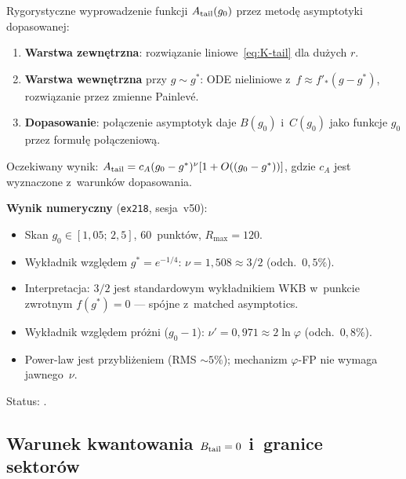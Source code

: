 \begin{problem}\label{prob:K-OJ1}
Rygorystyczne wyprowadzenie funkcji $A_{\rm tail}(g_0)$
przez metodę asymptotyki dopasowanej:
\begin{enumerate}[nosep]
  \item \textbf{Warstwa zewnętrzna}: rozwiązanie liniowe~\eqref{eq:K-tail}
        dla dużych $r$.
  \item \textbf{Warstwa wewnętrzna} przy $g \sim g^*$: ODE nieliniowe
        z~$f \approx f'_*(g-g^*)$, rozwiązanie przez zmienne Painlevé.
  \item \textbf{Dopasowanie}: połączenie asymptotyk daje $B(g_0)$ i~$C(g_0)$
        jako funkcje $g_0$ przez formułę połączeniową.
\end{enumerate}
Oczekiwany wynik: $A_{\rm tail} = c_A(g_0-g^*)^\nu[1+O((g_0-g^*))]$,
gdzie $c_A$ jest wyznaczone z~warunków dopasowania.

\medskip\noindent
\textbf{Wynik numeryczny} (\texttt{ex218}, sesja~v50):
\begin{itemize}[nosep]
  \item Skan $g_0\in[1{,}05;\,2{,}5]$, 60~punktów, $R_{\max}=120$.
  \item Wykładnik względem $g^* = e^{-1/4}$:
    $\nu = 1{,}508 \approx 3/2$ (odch.~$0{,}5\%$).
  \item Interpretacja: $3/2$ jest standardowym wykładnikiem WKB
    w~punkcie zwrotnym $f(g^*)=0$ --- spójne z~matched asymptotics.
  \item Wykładnik względem próżni ($g_0-1$):
    $\nu' = 0{,}971 \approx 2\ln\varphi$ (odch.~$0{,}8\%$).
  \item Power-law jest przybliżeniem (RMS $\sim 5\%$);
    mechanizm $\varphi$-FP nie wymaga jawnego~$\nu$.
\end{itemize}
Status: .
\end{problem}

\subsection{Warunek kwantowania $B_{\rm tail} = 0$ i~granice sektorów}%
\label{app:K-kwantowanie}

